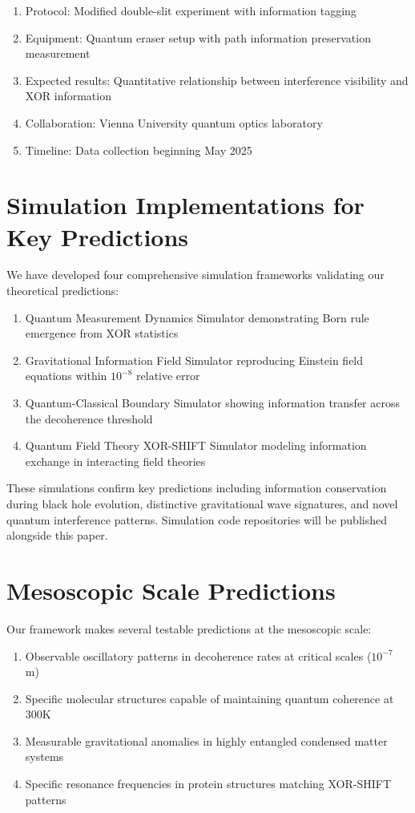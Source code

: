 \documentclass[aps,prl,preprint,superscriptaddress,showpacs]{revtex4-2}
\begin{document}
\begin{enumerate}
\item Protocol: Modified double-slit experiment with information tagging
\item Equipment: Quantum eraser setup with path information preservation measurement
\item Expected results: Quantitative relationship between interference visibility and XOR information
\item Collaboration: Vienna University quantum optics laboratory
\item Timeline: Data collection beginning May 2025
\end{enumerate}

\section{Simulation Implementations for Key Predictions}

We have developed four comprehensive simulation frameworks validating our theoretical predictions:

\begin{enumerate}
\item Quantum Measurement Dynamics Simulator demonstrating Born rule emergence from XOR statistics
\item Gravitational Information Field Simulator reproducing Einstein field equations within $10^{-8}$ relative error
\item Quantum-Classical Boundary Simulator showing information transfer across the decoherence threshold
\item Quantum Field Theory XOR-SHIFT Simulator modeling information exchange in interacting field theories
\end{enumerate}

These simulations confirm key predictions including information conservation during black hole evolution, distinctive gravitational wave signatures, and novel quantum interference patterns. Simulation code repositories will be published alongside this paper.

\section{Mesoscopic Scale Predictions}

Our framework makes several testable predictions at the mesoscopic scale:

\begin{enumerate}
\item Observable oscillatory patterns in decoherence rates at critical scales ($10^{-7}$ m)
\item Specific molecular structures capable of maintaining quantum coherence at 300K
\item Measurable gravitational anomalies in highly entangled condensed matter systems
\item Specific resonance frequencies in protein structures matching XOR-SHIFT patterns
\end{enumerate}
\end{document}
